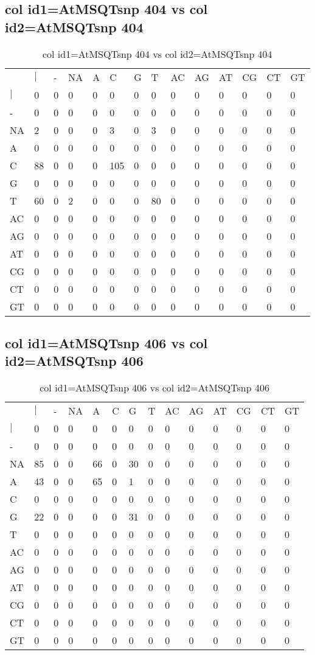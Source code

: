 \subsection{col id1=AtMSQTsnp 404 vs col id2=AtMSQTsnp 404}
\begin{center}
\begin{longtable}{|l|l|l|l|l|l|l|l|l|l|l|l|l|l|}
\caption{col id1=AtMSQTsnp 404 vs col id2=AtMSQTsnp 404} \label{table_dm920}\\
\hline
\\
\hline
&$|$&-&NA&A&C&G&T&AC&AG&AT&CG&CT&GT\\
$|$&0&0&0&0&0&0&0&0&0&0&0&0&0\\
-&0&0&0&0&0&0&0&0&0&0&0&0&0\\
NA&2&0&0&0&3&0&3&0&0&0&0&0&0\\
A&0&0&0&0&0&0&0&0&0&0&0&0&0\\
C&88&0&0&0&105&0&0&0&0&0&0&0&0\\
G&0&0&0&0&0&0&0&0&0&0&0&0&0\\
T&60&0&2&0&0&0&80&0&0&0&0&0&0\\
AC&0&0&0&0&0&0&0&0&0&0&0&0&0\\
AG&0&0&0&0&0&0&0&0&0&0&0&0&0\\
AT&0&0&0&0&0&0&0&0&0&0&0&0&0\\
CG&0&0&0&0&0&0&0&0&0&0&0&0&0\\
CT&0&0&0&0&0&0&0&0&0&0&0&0&0\\
GT&0&0&0&0&0&0&0&0&0&0&0&0&0\\
\hline
\end{longtable}
\end{center}

\subsection{col id1=AtMSQTsnp 406 vs col id2=AtMSQTsnp 406}
\begin{center}
\begin{longtable}{|l|l|l|l|l|l|l|l|l|l|l|l|l|l|}
\caption{col id1=AtMSQTsnp 406 vs col id2=AtMSQTsnp 406} \label{table_dm922}\\
\hline
\\
\hline
&$|$&-&NA&A&C&G&T&AC&AG&AT&CG&CT&GT\\
$|$&0&0&0&0&0&0&0&0&0&0&0&0&0\\
-&0&0&0&0&0&0&0&0&0&0&0&0&0\\
NA&85&0&0&66&0&30&0&0&0&0&0&0&0\\
A&43&0&0&65&0&1&0&0&0&0&0&0&0\\
C&0&0&0&0&0&0&0&0&0&0&0&0&0\\
G&22&0&0&0&0&31&0&0&0&0&0&0&0\\
T&0&0&0&0&0&0&0&0&0&0&0&0&0\\
AC&0&0&0&0&0&0&0&0&0&0&0&0&0\\
AG&0&0&0&0&0&0&0&0&0&0&0&0&0\\
AT&0&0&0&0&0&0&0&0&0&0&0&0&0\\
CG&0&0&0&0&0&0&0&0&0&0&0&0&0\\
CT&0&0&0&0&0&0&0&0&0&0&0&0&0\\
GT&0&0&0&0&0&0&0&0&0&0&0&0&0\\
\hline
\end{longtable}
\end{center}

